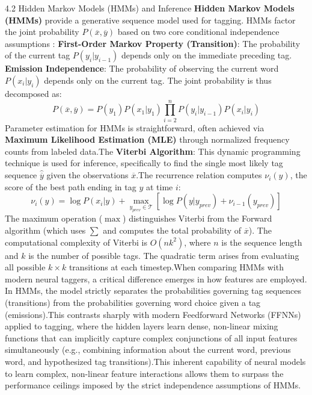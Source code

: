 \documentclass{article}
\begin{document}
4.2 Hidden Markov Models (HMMs) and Inference
\textbf{Hidden Markov Models (HMMs)} provide a generative sequence model used for tagging. HMMs factor the joint probability $P(\overline{x}, \overline{y})$ based on two core conditional independence assumptions \footnotemark[1]:
\textbf{First-Order Markov Property (Transition)}: The probability of the current tag $P(y_i|y_{i-1})$ depends only on the immediate preceding tag.
\textbf{Emission Independence}: The probability of observing the current word $P(x_i|y_i)$ depends only on the current tag.
The joint probability is thus decomposed as:
$$P(\overline{x}, \overline{y}) = P(y_1) P(x_1|y_1) \prod_{i=2}^{n} P(y_i|y_{i-1}) P(x_i|y_i)$$
Parameter estimation for HMMs is straightforward, often achieved via \textbf{Maximum Likelihood Estimation (MLE)} through normalized frequency counts from labeled data.\footnotemark[1]
The \textbf{Viterbi Algorithm}: This dynamic programming technique is used for inference, specifically to find the single most likely tag sequence $\hat{\overline{y}}$ given the observations $\overline{x}$.\footnotemark[1] The recurrence relation computes $\nu_i(y)$, the score of the best path ending in tag $y$ at time $i$:
$$\nu_i(y) = \log P(x_i|y) + \max_{y_{prev} \in \mathcal{T}} \left[\log P(y|y_{prev}) + \nu_{i-1}(y_{prev})\right]$$
The maximum operation ($\max$) distinguishes Viterbi from the Forward algorithm (which uses $\sum$ and computes the total probability of $\overline{x}$). \footnotemark[1] The computational complexity of Viterbi is $O(nk^2)$, where $n$ is the sequence length and $k$ is the number of possible tags. The quadratic term arises from evaluating all possible $k\times k$ transitions at each timestep.\footnotemark[1]
When comparing HMMs with modern neural taggers, a critical difference emerges in how features are employed. In HMMs, the model strictly separates the probabilities governing tag sequences (transitions) from the probabilities governing word choice given a tag (emissions).\footnotemark[1] This contrasts sharply with modern Feedforward Networks (FFNNs) applied to tagging, where the hidden layers learn dense, non-linear mixing functions that can implicitly capture complex conjunctions of all input features simultaneously (e.g., combining information about the current word, previous word, and hypothesized tag transitions).\footnotemark[1] This inherent capability of neural models to learn complex, non-linear feature interactions allows them to surpass the performance ceilings imposed by the strict independence assumptions of HMMs.
\end{document}
